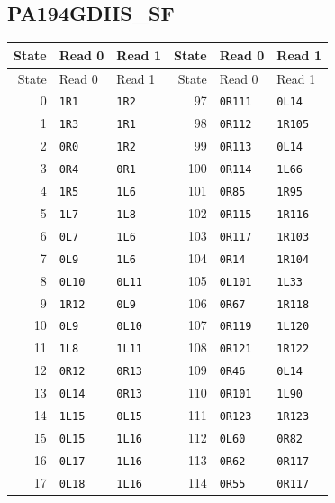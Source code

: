 \subsection{PA194GDHS\_SF}
\begingroup\small
\begin{longtable}{@{}rll@{\hspace{2em}}rll@{}}
\toprule State & Read 0 & Read 1 & State & Read 0 & Read 1\\\midrule\endfirsthead
\toprule State & Read 0 & Read 1 & State & Read 0 & Read 1\\\midrule\endhead
0 & \texttt{1R1} & \texttt{1R2} & 97 & \texttt{0R111} & \texttt{0L14}\\
1 & \texttt{1R3} & \texttt{1R1} & 98 & \texttt{0R112} & \texttt{1R105}\\
2 & \texttt{0R0} & \texttt{1R2} & 99 & \texttt{0R113} & \texttt{0L14}\\
3 & \texttt{0R4} & \texttt{0R1} & 100 & \texttt{0R114} & \texttt{1L66}\\
4 & \texttt{1R5} & \texttt{1L6} & 101 & \texttt{0R85} & \texttt{1R95}\\
5 & \texttt{1L7} & \texttt{1L8} & 102 & \texttt{0R115} & \texttt{1R116}\\
6 & \texttt{0L7} & \texttt{1L6} & 103 & \texttt{0R117} & \texttt{1R103}\\
7 & \texttt{0L9} & \texttt{1L6} & 104 & \texttt{0R14} & \texttt{1R104}\\
8 & \texttt{0L10} & \texttt{0L11} & 105 & \texttt{0L101} & \texttt{1L33}\\
9 & \texttt{1R12} & \texttt{0L9} & 106 & \texttt{0R67} & \texttt{1R118}\\
10 & \texttt{0L9} & \texttt{0L10} & 107 & \texttt{0R119} & \texttt{1L120}\\
11 & \texttt{1L8} & \texttt{1L11} & 108 & \texttt{0R121} & \texttt{1R122}\\
12 & \texttt{0R12} & \texttt{0R13} & 109 & \texttt{0R46} & \texttt{0L14}\\
13 & \texttt{0L14} & \texttt{0R13} & 110 & \texttt{0R101} & \texttt{1L90}\\
14 & \texttt{1L15} & \texttt{0L15} & 111 & \texttt{0R123} & \texttt{1R123}\\
15 & \texttt{0L15} & \texttt{1L16} & 112 & \texttt{0L60} & \texttt{0R82}\\
16 & \texttt{0L17} & \texttt{1L16} & 113 & \texttt{0R62} & \texttt{0R117}\\
17 & \texttt{0L18} & \texttt{1L16} & 114 & \texttt{0R55} & \texttt{0R117}\\

\end{longtable}
